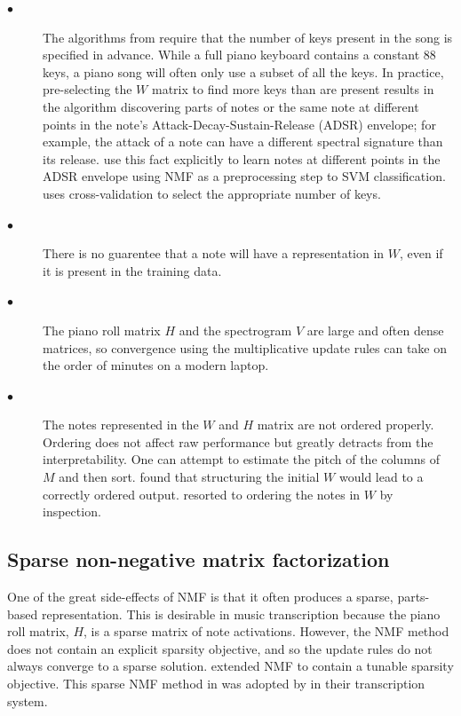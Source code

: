 \documentclass[5p]{elsarticle}
\begin{document}
\begin{description}
\item[$\bullet$] The algorithms from \citet{seung2001algorithms} require that the number of keys present in the song is specified in advance. While a full piano keyboard contains a constant 88 keys, a piano song will often only use a subset of all the keys. In practice, pre-selecting the $W$ matrix to find more keys than are present results in the algorithm discovering parts of notes or the same note at different points in the note's Attack-Decay-Sustain-Release (ADSR) envelope; for example, the attack of a note can have a different spectral signature than its release. \citet{weninger2013discriminative} use this fact explicitly to learn notes at different points in the ADSR envelope using NMF as a preprocessing step to SVM classification. \citet{} uses cross-validation to select the appropriate number of keys.
\item[$\bullet$] There is no guarentee that a note will have a representation in $W$, even if it is present in the training data.
\item[$\bullet$] The piano roll matrix $H$ and the spectrogram $V$ are large and often dense matrices, so convergence using the multiplicative update rules can take on the order of minutes on a modern laptop. 
\item[$\bullet$] The notes represented in the $W$ and $H$ matrix are not ordered properly. Ordering does not affect raw performance but greatly detracts from the interpretability. One can attempt to estimate the pitch of the columns of $M$ and then sort. \citet{abdallah2004polyphonic} found that structuring the initial $W$ would lead to a correctly ordered output. \citet{boulangerlewandowski2012} resorted to ordering the notes in $W$ by inspection. 
\end{description}

\subsection{Sparse non-negative matrix factorization}

One of the great side-effects of NMF is that it often produces a sparse, parts-based representation. This is desirable in music transcription because the piano roll matrix, $H$, is a sparse matrix of note activations. However, the NMF method does not contain an explicit sparsity objective, and so the update rules do not always converge to a sparse solution. \citet{hoyer2004non} extended NMF to contain a tunable sparsity objective. This sparse NMF method in \citet{hoyer2004non} was adopted by \citet{abdallah2004polyphonic} in their transcription system. 
\end{document}
